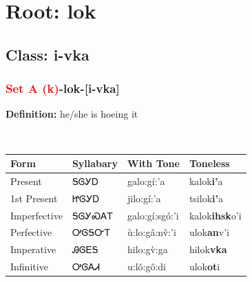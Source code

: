 \needspace{4in}
\section*{Root: lok}
\nopagebreak
{}
\needspace{3in}
\subsection*{Class: i-vka}
\nopagebreak
\needspace{2in}
\subsubsection*{\textcolor{Red}{Set A (k)}{-}\textbf{lok}{-}[i-vka]}
\nopagebreak
\textbf{Definition: } he/she is hoeing it
\\[0.5em]
\begin{tabularx}{\textwidth}{l X X X}%
\toprule%
\textbf{Form}&\textbf{Syllabary}&\textbf{With Tone}&\textbf{Toneless}\\%
\midrule%
Present&ᎦᎶᎩᎠ&galo:gí:’a&kalok\textbf{i'}a\\%
1st Present&ᏥᎶᎩᎠ&jilo:gí:’a&tsilok\textbf{i'}a\\%
Imperfective&ᎦᎶᎩᏍᎪᎢ&galo:gí:sgó:’i&kalok\textbf{ihsk}o'i\\%
Perfective&ᎤᎶᎦᏅᎢ&ù:lo:gâ:nv̌:’i&ulok\textbf{an}v'i\\%
Imperative&ᎯᎶᎬᎦ&hilo:gv̀:ga&hilok\textbf{vka}\\%
Infinitive&ᎤᎶᎪᏗ&u:lǒ:gô:di&ulok\textbf{ot}i\\%
\bottomrule%
\end{tabularx}
\\[1em]